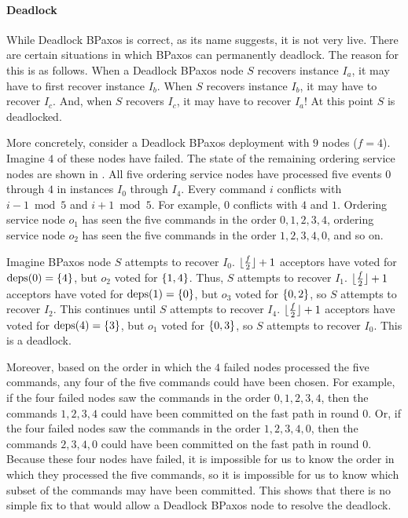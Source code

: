 \paragraph{Deadlock}
While Deadlock BPaxos is correct, as its name suggests, it is not very live.
There are certain situations in which BPaxos can permanently deadlock. The
reason for this is as follows. When a Deadlock BPaxos node $S$ recovers
instance $I_a$, it may have to first recover instance $I_b$. When $S$ recovers
instance $I_b$, it may have to recover $I_c$. And, when $S$ recovers $I_c$, it
may have to recover $I_a$! At this point $S$ is deadlocked.

More concretely, consider a Deadlock BPaxos deployment with $9$ nodes ($f =
4$). Imagine $4$ of these nodes have failed. The state of the remaining
ordering service nodes are shown in . All five
ordering service nodes have processed five events $0$ through $4$ in instances
$I_0$ through $I_4$. Every command $i$ conflicts with $i - 1 \bmod 5$ and $i +
1 \bmod 5$. For example, $0$ conflicts with $4$ and $1$. Ordering service node
$o_1$ has seen the five commands in the order $0, 1, 2, 3, 4$, ordering service
node $o_2$ has seen the five commands in the order $1, 2, 3, 4, 0$, and so on.

{}

Imagine BPaxos node $S$ attempts to recover $I_0$. $\lfloor\frac{f}{2}\rfloor + 1$
acceptors have voted for $\text{deps}(0) = \{4\}$, but $o_2$ voted for $\{1,
4\}$. Thus, $S$ attempts to recover $I_1$. $\lfloor\frac{f}{2}\rfloor + 1$ acceptors have
voted for $\text{deps}(1) = \{0\}$, but $o_3$ voted for $\{0, 2\}$, so $S$
attempts to recover $I_2$. This continues until $S$ attempts to recover $I_4$.
$\lfloor\frac{f}{2}\rfloor + 1$ acceptors have voted for $\text{deps}(4) = \{3\}$, but $o_1$
voted for $\{0, 3\}$, so $S$ attempts to recover $I_0$. This is a deadlock.

Moreover, based on the order in which the $4$ failed nodes processed the five
commands, any four of the five commands could have been chosen. For example, if
the four failed nodes saw the commands in the order $0, 1, 2, 3, 4$, then the
commands $1, 2, 3, 4$ could have been committed on the fast path in round 0.
Or, if the four failed nodes saw the commands in the order $1, 2, 3, 4, 0$,
then the commands $2, 3, 4, 0$ could have been committed on the fast path in
round 0. Because these four nodes have failed, it is impossible for us to know
the order in which they processed the five commands, so it is impossible for us
to know which subset of the commands may have been committed. This shows that
there is no simple fix to  that would allow a Deadlock
BPaxos node to resolve the deadlock.

